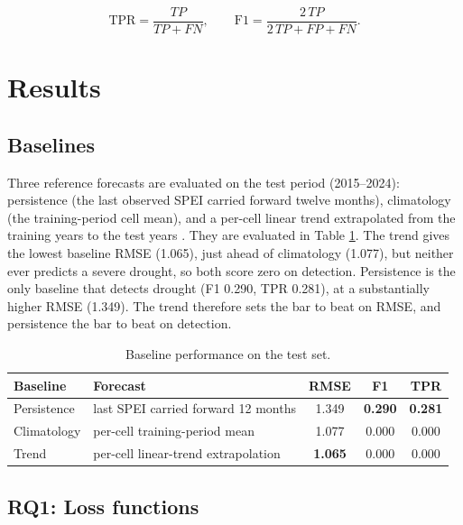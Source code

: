 \documentclass[
]{krantz}
\begin{document}
\[\mathrm{TPR} = \frac{TP}{TP + FN}, \qquad \mathrm{F1} = \frac{2\,TP}{2\,TP + FP + FN}.\]

\section{Results}\label{results}

\subsection{Baselines}\label{baselines}

Three reference forecasts are evaluated on the test period (2015--2024): persistence (the last observed SPEI carried forward twelve months), climatology (the training-period cell mean), and a per-cell linear trend extrapolated from the training years to the test years \citep{wilks2011, jolliffe2003}.
They are evaluated in Table \ref{tab:dp-baselines}.
The trend gives the lowest baseline RMSE (1.065), just ahead of climatology (1.077), but neither ever predicts a severe drought, so both score zero on detection.
Persistence is the only baseline that detects drought (F1 0.290, TPR 0.281), at a substantially higher RMSE (1.349).
The trend therefore sets the bar to beat on RMSE, and persistence the bar to beat on detection.

\begin{table}[!h]
\centering
\caption{\label{tab:dp-baselines}Baseline performance on the test set.}
\centering
\fontsize{9}{11}\selectfont
\begin{tabular}[t]{llccc}
\toprule
Baseline & Forecast & RMSE & F1 & TPR\\
\midrule
Persistence & last SPEI carried forward 12 months & 1.349 & \textbf{0.290} & \textbf{0.281}\\
Climatology & per-cell training-period mean & 1.077 & 0.000 & 0.000\\
Trend & per-cell linear-trend extrapolation & \textbf{1.065} & 0.000 & 0.000\\
\bottomrule
\end{tabular}
\end{table}

\subsection{RQ1: Loss functions}\label{rq1-loss-functions-1}
\end{document}

